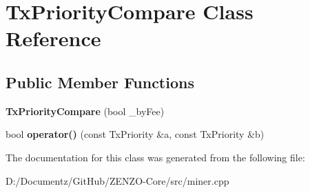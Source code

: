 \hypertarget{class_tx_priority_compare}{}\section{Tx\+Priority\+Compare Class Reference}
\label{class_tx_priority_compare}
\subsection*{Public Member Functions}
\begin{DoxyCompactItemize}
\item 
\mbox{\label{class_tx_priority_compare_a2ee1aac9d165bbeaaf2a687373f318ad}} 
{\bfseries Tx\+Priority\+Compare} (bool \+\_\+by\+Fee)
\item 
\mbox{\label{class_tx_priority_compare_ab50fdbeb5862709d13a271c11ade1775}} 
bool {\bfseries operator()} (const Tx\+Priority \&a, const Tx\+Priority \&b)
\end{DoxyCompactItemize}


The documentation for this class was generated from the following file\+:\begin{DoxyCompactItemize}
\item 
D\+:/\+Documentz/\+Git\+Hub/\+Z\+E\+N\+Z\+O-\/\+Core/src/miner.\+cpp\end{DoxyCompactItemize}
